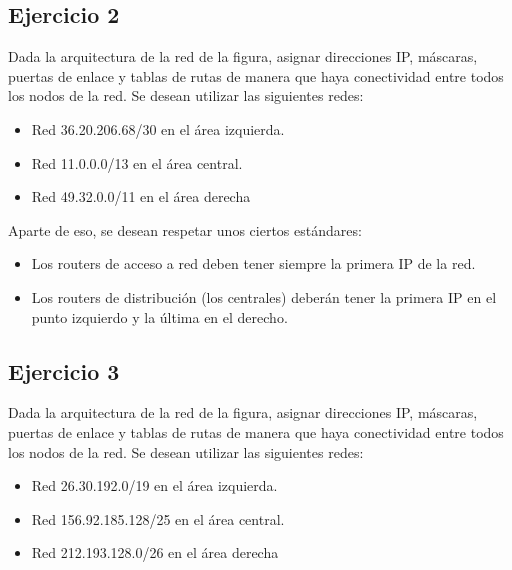 \documentclass[letterpaper,10pt,spanish]{sphinxmanual}
\begin{document}
\subsection{Ejercicio 2}
\label{\detokenize{t2_integracion_elementos/ejercicios_subredes_ipv4/ejercicios_dos_router:ejercicio-2}}
\sphinxAtStartPar
Dada la arquitectura de la red de la figura, asignar direcciones IP, máscaras, puertas de enlace y tablas de rutas de manera que haya conectividad entre todos
los nodos de la red. Se desean utilizar las siguientes redes:
\begin{itemize}
\item {} 
\sphinxAtStartPar
Red 36.20.206.68/30 en el área izquierda.

\item {} 
\sphinxAtStartPar
Red 11.0.0.0/13 en el área central.

\item {} 
\sphinxAtStartPar
Red 49.32.0.0/11 en el área derecha

\end{itemize}

\begin{figure}[htbp]
\centering

\noindent{}
\end{figure}

\sphinxAtStartPar
Aparte de eso, se desean respetar unos ciertos estándares:
\begin{itemize}
\item {} 
\sphinxAtStartPar
Los routers de acceso a red deben tener siempre la primera IP de la red.

\item {} 
\sphinxAtStartPar
Los routers de distribución (los centrales) deberán tener la primera IP en el punto izquierdo y la última en el derecho.

\end{itemize}


\subsection{Ejercicio 3}
\label{\detokenize{t2_integracion_elementos/ejercicios_subredes_ipv4/ejercicios_dos_router:ejercicio-3}}
\sphinxAtStartPar
Dada la arquitectura de la red de la figura, asignar direcciones IP, máscaras, puertas de enlace y tablas de rutas de manera que haya conectividad entre todos
los nodos de la red. Se desean utilizar las siguientes redes:
\begin{itemize}
\item {} 
\sphinxAtStartPar
Red 26.30.192.0/19 en el área izquierda.

\item {} 
\sphinxAtStartPar
Red 156.92.185.128/25 en el área central.

\item {} 
\sphinxAtStartPar
Red 212.193.128.0/26 en el área derecha

\end{itemize}
\end{document}
